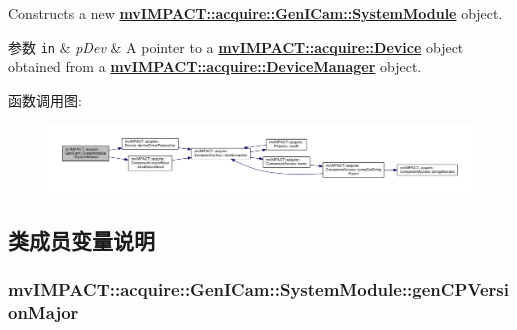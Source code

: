 Constructs a new {\bfseries \hyperlink{classmv_i_m_p_a_c_t_1_1acquire_1_1_gen_i_cam_1_1_system_module}{mv\+I\+M\+P\+A\+C\+T\+::acquire\+::\+Gen\+I\+Cam\+::\+System\+Module}} object. 


\begin{DoxyParams}[1]{参数}
\mbox{\tt in}  & {\em p\+Dev} & A pointer to a {\bfseries \hyperlink{classmv_i_m_p_a_c_t_1_1acquire_1_1_device}{mv\+I\+M\+P\+A\+C\+T\+::acquire\+::\+Device}} object obtained from a {\bfseries \hyperlink{classmv_i_m_p_a_c_t_1_1acquire_1_1_device_manager}{mv\+I\+M\+P\+A\+C\+T\+::acquire\+::\+Device\+Manager}} object. \\
\hline
\end{DoxyParams}


函数调用图\+:
\nopagebreak
\begin{figure}[H]
\begin{center}
\leavevmode
\includegraphics[width=350pt]{classmv_i_m_p_a_c_t_1_1acquire_1_1_gen_i_cam_1_1_system_module_afa84665420b30c9d83ed1aada601a583_cgraph}
\end{center}
\end{figure}




\subsection{类成员变量说明}
\hypertarget{classmv_i_m_p_a_c_t_1_1acquire_1_1_gen_i_cam_1_1_system_module_a2f65ada43ea781c0a47a094deb7dd39e}{
\subsubsection[{gen\+C\+P\+Version\+Major}]{ mv\+I\+M\+P\+A\+C\+T\+::acquire\+::\+Gen\+I\+Cam\+::\+System\+Module\+::gen\+C\+P\+Version\+Major}}\label{classmv_i_m_p_a_c_t_1_1acquire_1_1_gen_i_cam_1_1_system_module_a2f65ada43ea781c0a47a094deb7dd39e}


